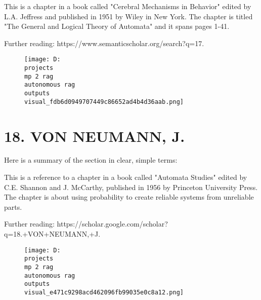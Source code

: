 \documentclass[12pt,a4paper]{article}
\begin{document}
This is a chapter in a book called "Cerebral Mechanisms in Behavior" edited by L.A. Jeffress and published in 1951 by Wiley in New York. The chapter is titled "The General and Logical Theory of Automata" and it spans pages 1-41.

Further reading: https://www.semanticscholar.org/search?q=17.%
\begin{figure}[h]
\centering
\texttt{[image: D:\\projects\\mp 2 rag\\autonomous rag\\outputs\\visual\_fdb6d0949707449c86652ad4b4d36aab.png]}
\end{figure}
\section{18. VON NEUMANN, J.}
Here is a summary of the section in clear, simple terms:

This is a reference to a chapter in a book called "Automata Studies" edited by C.E. Shannon and J. McCarthy, published in 1956 by Princeton University Press. The chapter is about using probability to create reliable systems from unreliable parts.

Further reading: https://scholar.google.com/scholar?q=18.+VON+NEUMANN,+J.
\begin{figure}[h]
\centering
\texttt{[image: D:\\projects\\mp 2 rag\\autonomous rag\\outputs\\visual\_e471c9298acd462096fb99035e0c8a12.png]}
\end{figure}
\end{document}
